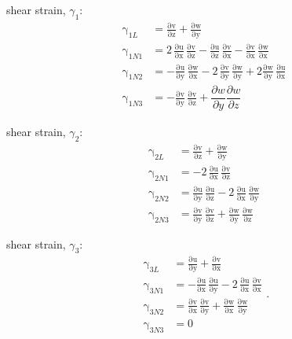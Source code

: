 shear strain, $\gamma_1$:
\begin{subequations}
    \begin{align}
    \mathrm \gamma_{1L} & = \mathrm{\frac{\partial v}{\partial z}} + \mathrm{\frac{\partial w}{\partial y}}\\
    \mathrm \gamma_{1N1} & = 2 \, \mathrm{\frac{\partial u}{\partial x}}\, \mathrm{\frac{\partial v}{\partial z}}	 - \mathrm{\frac{ \partial u}{\partial z}}\, \mathrm{\frac{ \partial v}{\partial x}}-   \mathrm{\frac{\partial v}{\partial x}}\, \mathrm{\frac{\partial w}{\partial x}}\\
    \mathrm \gamma_{1N2} & = - \mathrm{\frac{\partial u}{\partial y}}\, \mathrm{\frac{\partial w}{\partial x}} - 2 \, \mathrm{\frac{\partial v}{\partial y}}\, \mathrm{\frac{\partial w}{\partial y}} + 2 \mathrm{\frac{\partial w}{\partial y}}\, \mathrm{\frac{\partial u}{\partial x}}\\
    \mathrm \gamma_{1N3} & = - \mathrm{\frac{\partial v}{\partial y}}\, \mathrm{\frac{\partial v}{\partial z}} + \dfrac{\partial w}{\partial y} \dfrac{\partial w}{\partial z}
    \end{align}
\end{subequations}

shear strain, $\gamma_2$:
\begin{subequations}
    \begin{align}
    \mathrm \gamma_{2L} & = \mathrm{\frac{\partial v}{\partial z}} + \mathrm{\frac{\partial w}{\partial y}}\\
    \mathrm \gamma_{2N1} & =  - 2 \, \mathrm{\frac{ \partial u}{\partial x}}\, \mathrm{\frac{ \partial v}{\partial z}}\\
    \mathrm \gamma_{2N2} & = \mathrm{\frac{\partial u}{\partial y}}\, \mathrm{\frac{\partial u}{\partial z}} - 2 \, \mathrm{\frac{\partial u}{\partial x}}\, \mathrm{\frac{\partial w}{\partial y}}\\
    \mathrm \gamma_{2N3} & = \mathrm{\frac{\partial v}{\partial y}}\, \mathrm{\frac{\partial v}{\partial z}} + \mathrm{\frac{\partial w}{\partial y}}\, \mathrm{\frac{\partial w}{\partial z}}
    \end{align}
\end{subequations}

shear strain, $\gamma_3$:
\begin{subequations}
    \begin{align}
    \mathrm \gamma_{3L} & = \mathrm{\frac{\partial u}{\partial y}} + \mathrm{\frac{\partial v}{\partial x}}\\
    \mathrm \gamma_{3N1} & = - \mathrm{\frac{\partial u}{\partial x}}\, \mathrm{\frac{\partial u}{\partial y}} - 2 \, \mathrm{\frac{ \partial u}{\partial x}}\, \mathrm{\frac{ \partial v}{\partial x}}\\
    \mathrm \gamma_{3N2} & = \mathrm{\frac{\partial v}{\partial x}}\, \mathrm{\frac{\partial v}{\partial y}} + \mathrm{\frac{\partial w}{\partial x}}\, \mathrm{\frac{\partial w}{\partial y}}\\
    \mathrm \gamma_{3N3} & = 0
    \end{align}.
\end{subequations}

